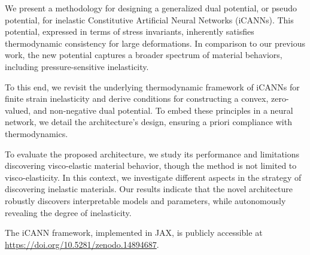 We present a methodology for designing a generalized dual potential, or pseudo potential, for inelastic Constitutive Artificial Neural Networks (iCANNs). 
This potential, expressed in terms of stress invariants, inherently satisfies thermodynamic consistency for large deformations. 
In comparison to our previous work, the new potential captures a broader spectrum of material behaviors, including pressure-sensitive inelasticity.

To this end, we revisit the underlying thermodynamic framework of iCANNs for finite strain inelasticity and derive conditions for constructing a convex, zero-valued, and non-negative dual potential. 
To embed these principles in a neural network, we detail the architecture's design, ensuring a priori compliance with thermodynamics.

To evaluate the proposed architecture, we study its performance and limitations discovering visco-elastic material behavior, though the method is not limited to visco-elasticity.
In this context, we investigate different aspects in the strategy of discovering inelastic materials.
Our results indicate that the novel architecture robustly discovers interpretable models and parameters, while autonomously revealing the degree of inelasticity.

The iCANN framework, implemented in JAX, is publicly accessible at \url{https://doi.org/10.5281/zenodo.14894687}.
